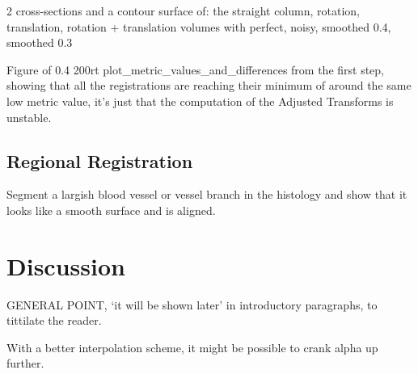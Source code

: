   \begin{figure}
    \centering
    \caption{}
    \label{fig:image1.png}
  \end{figure}

  
  
  2 cross-sections and a contour surface of:
    the straight column, rotation, translation, rotation + translation volumes
      with perfect, noisy, smoothed 0.4, smoothed 0.3
        
  Figure of 0.4 200rt plot\_metric\_values\_and\_differences from the first step, showing that all the registrations are reaching their minimum of around the same low metric value, it's just that the computation of the Adjusted Transforms is unstable.
  
  
  
  
  \subsection{Regional Registration} %
  \label{sub:regional_registration}
    Segment a largish blood vessel or vessel branch in the histology and show that it looks like a smooth surface and is aligned. 


\section{Discussion} %
\label{sec:discussion}
  GENERAL POINT, `it will be shown later' in introductory paragraphs, to tittilate the reader.
  
  With a better interpolation scheme, it might be possible to crank alpha up further.
  
